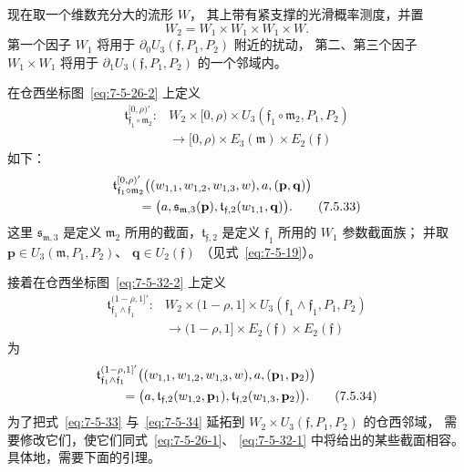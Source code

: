 现在取一个维数充分大的流形 $W$，
其上带有紧支撑的光滑概率测度，并置
\[
W_2=W_1\times W_1\times W_1\times W.
\]
第一个因子 $W_1$ 将用于
$\partial_0U_3(\mathfrak f,P_1,P_2)$ 附近的扰动，
第二、第三个因子 $W_1\times W_1$ 将用于
$\partial_1U_3(\mathfrak f,P_1,P_2)$ 的一个邻域内。

在仓西坐标图~\eqref{eq:7-5-26-2} 上定义
\[
\begin{aligned}
\mathfrak t_{\mathfrak f_1\circ\mathfrak m_2}^{[0,\rho)'}\colon
&W_2\times[0,\rho)\times
U_3(\mathfrak f_1\circ\mathfrak m_2,P_1,P_2)\\
&\longrightarrow
[0,\rho)\times E_3(\mathfrak m)\times E_2(\mathfrak f)
\end{aligned}
\]
如下：
\begin{align}
&\mathfrak t_{\mathfrak f_1\circ\mathfrak m_2}^{[0,\rho)'}
\bigl((w_{1,1},w_{1,2},w_{1,3},w),a,(\mathbf p,\mathbf q)\bigr)
\notag\\
&\qquad={}
\bigl(a,
\mathfrak s_{\mathfrak m,3}(\mathbf p),
\mathfrak t_{\mathfrak f,2}(w_{1,1},\mathbf q)\bigr).
\tag{7.5.33}\label{eq:7-5-33}
\end{align}
这里 $\mathfrak s_{\mathfrak m,3}$ 是定义 $\mathfrak m_2$
所用的截面，$\mathfrak t_{\mathfrak f,2}$ 是定义
$\mathfrak f_1$ 所用的 $W_1$ 参数截面族；
并取
$\mathbf p\in U_3(\mathfrak m,P_1,P_2)$、
$\mathbf q\in U_2(\mathfrak f)$
（见式~\eqref{eq:7-5-19}）。

接着在仓西坐标图~\eqref{eq:7-5-32-2} 上定义
\[
\begin{aligned}
\mathfrak t_{\mathfrak f_1\wedge\mathfrak f_1}^{(1-\rho,1]'}\colon
&W_2\times(1-\rho,1]\times
U_3(\mathfrak f_1\wedge\mathfrak f_1,P_1,P_2)\\
&\longrightarrow
(1-\rho,1]\times E_2(\mathfrak f)\times E_2(\mathfrak f)
\end{aligned}
\]
为
\begin{align}
&\mathfrak t_{\mathfrak f_1\wedge\mathfrak f_1}^{(1-\rho,1]'}
\bigl((w_{1,1},w_{1,2},w_{1,3},w),a,
(\mathbf p_1,\mathbf p_2)\bigr)
\notag\\
&\qquad={}
\bigl(a,
\mathfrak t_{\mathfrak f,2}(w_{1,2},\mathbf p_1),
\mathfrak t_{\mathfrak f,2}(w_{1,3},\mathbf p_2)\bigr).
\tag{7.5.34}\label{eq:7-5-34}
\end{align}
为了把式~\eqref{eq:7-5-33} 与~\eqref{eq:7-5-34}
延拓到 $W_2\times U_3(\mathfrak f,P_1,P_2)$ 的仓西邻域，
需要修改它们，使它们同式~\eqref{eq:7-5-26-1}、
\eqref{eq:7-5-32-1} 中将给出的某些截面相容。
具体地，需要下面的引理。

